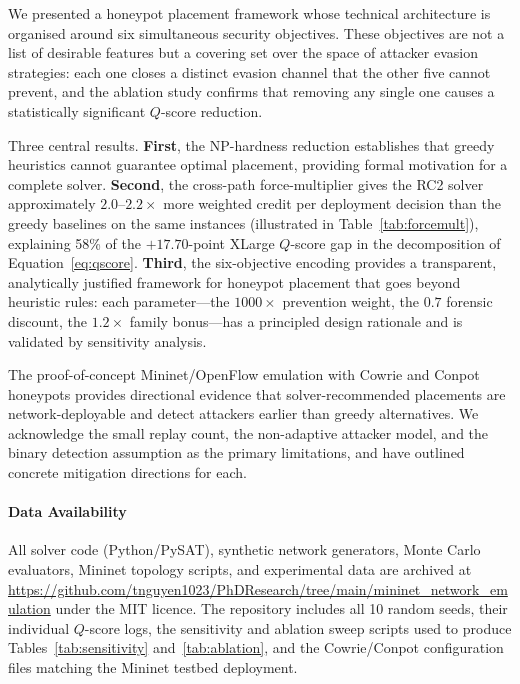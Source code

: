 \documentclass[journal]{IEEEtran}
\newcommand{\qscore}{$Q$-score}
\begin{document}
We presented a honeypot placement framework whose technical
architecture is organised around six simultaneous security
objectives. These objectives are not a list of desirable features
but a covering set over the space of attacker evasion strategies:
each one closes a distinct evasion channel that the other five
cannot prevent, and the ablation study confirms that removing any
single one causes a statistically significant \qscore{} reduction.

Three central results. \textbf{First}, the NP-hardness reduction
establishes that greedy heuristics cannot guarantee optimal
placement, providing formal motivation for a complete solver.
\textbf{Second}, the cross-path force-multiplier gives the RC2
solver approximately $2.0$--$2.2\times$ more weighted credit per
deployment decision than the greedy baselines on the same instances
(illustrated in Table~\ref{tab:forcemult}), explaining 58\% of the
$+17.70$-point XLarge \qscore{} gap in the decomposition of
Equation~\eqref{eq:qscore}.
\textbf{Third}, the six-objective encoding provides a transparent,
analytically justified framework for honeypot placement that goes
beyond heuristic rules: each parameter---the $1000\times$ prevention
weight, the $0.7$ forensic discount, the $1.2\times$ family
bonus---has a principled design rationale and is validated by
sensitivity analysis.

The proof-of-concept Mininet/OpenFlow emulation with Cowrie and
Conpot honeypots provides directional evidence that solver-recommended
placements are network-deployable and detect attackers earlier than
greedy alternatives. We acknowledge the small replay count, the
non-adaptive attacker model, and the binary detection assumption as
the primary limitations, and have outlined concrete mitigation
directions for each.

\paragraph{Data Availability}
All solver code (Python/PySAT), synthetic network generators, Monte
Carlo evaluators, Mininet topology scripts, and experimental data
are archived at\\
\url{https://github.com/tnguyen1023/PhDResearch/tree/main/mininet_network_emulation}
under the MIT licence. The repository includes all 10 random seeds,
their individual \qscore{} logs, the sensitivity and ablation sweep
scripts used to produce Tables~\ref{tab:sensitivity}
and~\ref{tab:ablation}, and the Cowrie/Conpot configuration files
matching the Mininet testbed deployment.
\end{document}
